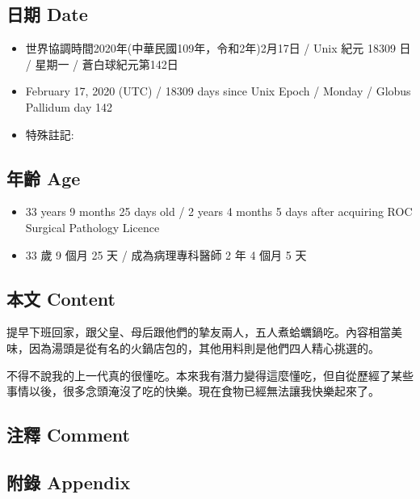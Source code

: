 \documentclass[a5paper, 12pt
]{book}
\providecommand{\tightlist}{%
  \setlength{\itemsep}{0pt}\setlength{\parskip}{0pt}}
\begin{document}
\hypertarget{ux65e5ux671f-date-78}{%
\subsection{日期 Date}\label{ux65e5ux671f-date-78}}

\begin{itemize}
\tightlist
\item
  世界協調時間2020年(中華民國109年，令和2年)2月17日 / Unix 紀元 18309 日
  / 星期一 / 蒼白球紀元第142日
\item
  February 17, 2020 (UTC) / 18309 days since Unix Epoch / Monday /
  Globus Pallidum day 142
\item
  特殊註記:
\end{itemize}

\hypertarget{ux5e74ux9f61-age-78}{%
\subsection{年齡 Age}\label{ux5e74ux9f61-age-78}}

\begin{itemize}
\tightlist
\item
  33 years 9 months 25 days old / 2 years 4 months 5 days after
  acquiring ROC Surgical Pathology Licence
\item
  33 歲 9 個月 25 天 / 成為病理專科醫師 2 年 4 個月 5 天
\end{itemize}

\hypertarget{ux672cux6587-content-78}{%
\subsection{本文 Content}\label{ux672cux6587-content-78}}

提早下班回家，跟父皇、母后跟他們的摯友兩人，五人煮蛤蠣鍋吃。內容相當美味，因為湯頭是從有名的火鍋店包的，其他用料則是他們四人精心挑選的。

不得不說我的上一代真的很懂吃。本來我有潛力變得這麼懂吃，但自從歷經了某些事情以後，很多念頭淹沒了吃的快樂。現在食物已經無法讓我快樂起來了。

\hypertarget{ux6ce8ux91cb-comment-77}{%
\subsection{注釋 Comment}\label{ux6ce8ux91cb-comment-77}}

\hypertarget{ux9644ux9304-appendix-78}{%
\subsection{附錄 Appendix}\label{ux9644ux9304-appendix-78}}
\end{document}
